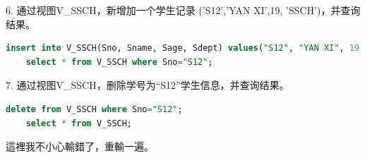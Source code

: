 \documentclass[12pt, a4paper]{report}
\begin{document}
6. 通过视图V\_SSCH，新增加一个学生记录 ('S12','YAN XI',19, 'SSCH')，并查询结果。\\

\begin{lstlisting}[language=SQL]
    insert into V_SSCH(Sno, Sname, Sage, Sdept) values("S12", "YAN XI", 19, "SSCH");
    select * from V_SSCH where Sno="S12";
\end{lstlisting}

\begin{figure}[H] %
    \centering %
\end{figure}

7. 通过视图V\_SSCH，删除学号为“S12”学生信息，并查询结果。\\

\begin{lstlisting}[language=SQL]
    delete from V_SSCH where Sno="S12";
    select * from V_SSCH;
\end{lstlisting}

這裡我不小心輸錯了，重輸一遍。

\begin{figure}[H] %
    \centering %
\end{figure}
\end{document}
